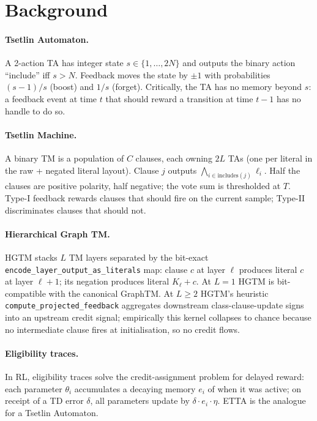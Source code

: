 \documentclass[11pt]{article}
\begin{document}
\section{Background}

\paragraph{Tsetlin Automaton.}  A 2-action TA \citep{granmo2018tsetlin} has integer state $s \in \{1, \ldots, 2N\}$ and outputs the binary action ``include'' iff $s > N$.  Feedback moves the state by $\pm 1$ with probabilities $(s-1)/s$ (boost) and $1/s$ (forget).  Critically, the TA has no memory beyond $s$: a feedback event at time $t$ that should reward a transition at time $t-1$ has no handle to do so.

\paragraph{Tsetlin Machine.}  A binary TM is a population of $C$ clauses, each owning $2L$ TAs (one per literal in the raw + negated literal layout).  Clause $j$ outputs $\bigwedge_{i \in \text{includes}(j)} \ell_i$.  Half the clauses are positive polarity, half negative; the vote sum is thresholded at $T$.  Type-I feedback rewards clauses that should fire on the current sample; Type-II discriminates clauses that should not.

\paragraph{Hierarchical Graph TM.}  HGTM \citep{anwar2026hgtm} stacks $L$ TM layers separated by the bit-exact \texttt{encode\_layer\_output\_as\_literals} map: clause $c$ at layer $\ell$ produces literal $c$ at layer $\ell+1$; its negation produces literal $K_\ell + c$.  At $L\!=\!1$ HGTM is bit-compatible with the canonical GraphTM.  At $L\!\geq\!2$ HGTM's heuristic \texttt{compute\_projected\_feedback} aggregates downstream class-clause-update signs into an upstream credit signal; empirically this kernel collapses to chance because no intermediate clause fires at initialisation, so no credit flows.

\paragraph{Eligibility traces.}  In RL, eligibility traces \citep{sutton1988learning} solve the credit-assignment problem for delayed reward: each parameter $\theta_i$ accumulates a decaying memory $e_i$ of when it was active; on receipt of a TD error $\delta$, all parameters update by $\delta \cdot e_i \cdot \eta$.  ETTA is the analogue for a Tsetlin Automaton.
\end{document}
